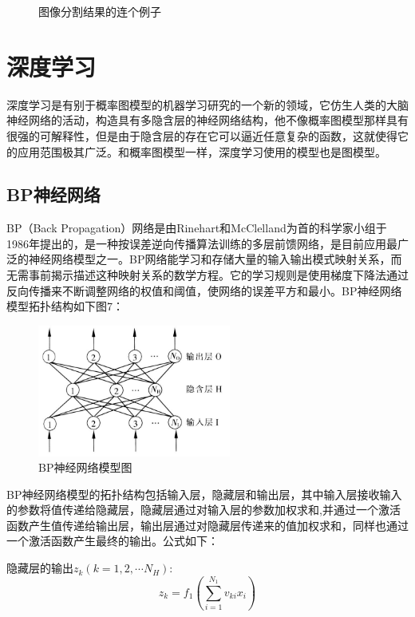\documentclass{article} %
\begin{document}
\begin{CJK*}{UTF8}{gkai}
\begin{figure}[h]
\begin{center}
\end{center}
\caption{图像分割结果的连个例子}
\end{figure}

\section{深度学习}
深度学习是有别于概率图模型的机器学习研究的一个新的领域，它仿生人类的大脑神经网络的活动，构造具有多隐含层的神经网络结构，他不像概率图模型那样具有很强的可解释性，但是由于隐含层的存在它可以逼近任意复杂的函数，这就使得它的应用范围极其广泛。和概率图模型一样，深度学习使用的模型也是图模型。

\subsection{BP神经网络}
BP（Back Propagation）网络是由Rinehart和McClelland为首的科学家小组于1986年提出的，是一种按误差逆向传播算法训练的多层前馈网络，是目前应用最广泛的神经网络模型之一。BP网络能学习和存储大量的输入输出模式映射关系，而无需事前揭示描述这种映射关系的数学方程。它的学习规则是使用梯度下降法通过反向传播来不断调整网络的权值和阈值，使网络的误差平方和最小。BP神经网络模型拓扑结构如下图7：

\begin{figure}[h]
\begin{center}

\includegraphics[width=2.5in]{7.jpg}

\end{center}
\caption{BP神经网络模型图}
\end{figure}
BP神经网络模型的拓扑结构包括输入层，隐藏层和输出层，其中输入层接收输入的参数将值传递给隐藏层，隐藏层通过对输入层的参数加权求和,并通过一个激活函数产生值传递给输出层，输出层通过对隐藏层传递来的值加权求和，同样也通过一个激活函数产生最终的输出。公式如下：

隐藏层的输出$z_{k}\left( k=1,2,\cdots N_{H} \right)$:
\begin{equation}
z_{k}=f_{1}\left( \sum_{i=1}^{N_{1}}v_{ki}x_{i} \right)
\end{equation}


\end{CJK*}
\end{document}
